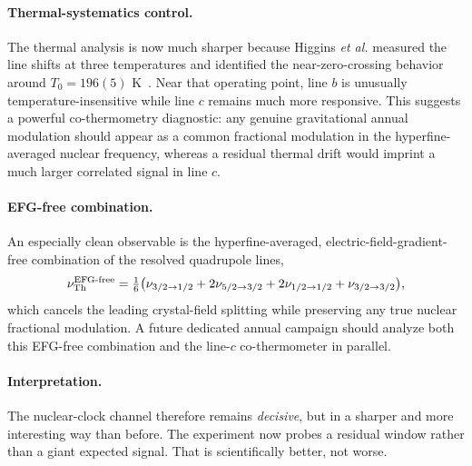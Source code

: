 \paragraph{Thermal-systematics control.}
The thermal analysis is now much sharper because Higgins \emph{et al.} measured the line shifts at three temperatures and identified the near-zero-crossing behavior around $T_0=196(5)$ K~\cite{Higgins2025}.  Near that operating point, line $b$ is unusually temperature-insensitive while line $c$ remains much more responsive.  This suggests a powerful co-thermometry diagnostic: any genuine gravitational annual modulation should appear as a common fractional modulation in the hyperfine-averaged nuclear frequency, whereas a residual thermal drift would imprint a much larger correlated signal in line $c$.

\paragraph{EFG-free combination.}
An especially clean observable is the hyperfine-averaged, electric-field-gradient-free combination of the resolved quadrupole lines,
\begin{equation}\label{eq:efg-free}
\nu_{\rm Th}^{\rm EFG\text{-}free}=\tfrac16\bigl(\nu_{3/2\to1/2}+2\nu_{5/2\to3/2}
+2\nu_{1/2\to1/2}+\nu_{3/2\to3/2}\bigr),
\end{equation}
which cancels the leading crystal-field splitting while preserving any true nuclear fractional modulation.  A future dedicated annual campaign should analyze both this EFG-free combination and the line-$c$ co-thermometer in parallel.

\paragraph{Interpretation.}
The nuclear-clock channel therefore remains \emph{decisive}, but in a sharper and more interesting way than before.  The experiment now probes a residual window rather than a giant expected signal.  That is scientifically better, not worse.

